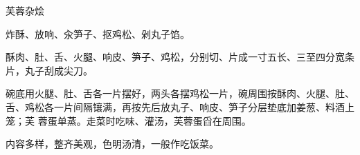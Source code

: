 %
%
%
%
%
%
%
\begin{recipe}{芙蓉杂烩}

\ingredients


\preparation

\step 炸酥、放响、汆笋子、抠鸡松、剁丸子馅。

\step 酥肉、肚、舌、火腿、响皮、笋子、鸡松，分别切、片成一寸五长、三至四分宽条
片，丸子刮成尖刀。

\step 碗底用火腿、肚、舌各一片摆好，两头各摆鸡松一片，碗周围按酥肉、火腿、肚、
舌、鸡松各一片间隔镶满，再按先后放丸子、响皮、笋子分层垫底加姜葱、料酒上笼；芙
蓉蛋单蒸。走菜时吃味、灌汤，芙蓉蛋舀在周围。

\features

内容多样，整齐美观，色明汤清，一般作吃饭菜。

\end{recipe}

